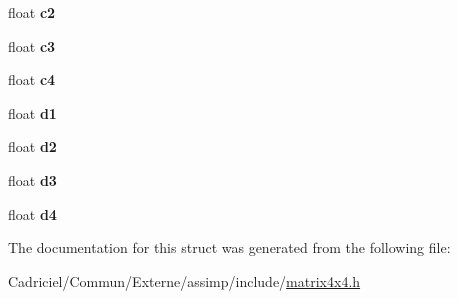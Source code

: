 \begin{DoxyCompactItemize}
\item 
float {\bfseries c2}\hypertarget{structai_matrix4x4_a67425f81054b1097c29b73bf317cfeeb}{}\label{structai_matrix4x4_a67425f81054b1097c29b73bf317cfeeb}

\item 
float {\bfseries c3}\hypertarget{structai_matrix4x4_aec8c5745b90139d472eb4e91f1373c1a}{}\label{structai_matrix4x4_aec8c5745b90139d472eb4e91f1373c1a}

\item 
float {\bfseries c4}\hypertarget{structai_matrix4x4_a7e3288f38a4e00d55c02272e1582e462}{}\label{structai_matrix4x4_a7e3288f38a4e00d55c02272e1582e462}

\item 
float {\bfseries d1}\hypertarget{structai_matrix4x4_a13f3800d9106e3be6d0e60b794c5a5ae}{}\label{structai_matrix4x4_a13f3800d9106e3be6d0e60b794c5a5ae}

\item 
float {\bfseries d2}\hypertarget{structai_matrix4x4_a6f17ca1c7e4b9377d0e332f85aab282b}{}\label{structai_matrix4x4_a6f17ca1c7e4b9377d0e332f85aab282b}

\item 
float {\bfseries d3}\hypertarget{structai_matrix4x4_a8d2910f62b34b1e2ace93b55e4db4b92}{}\label{structai_matrix4x4_a8d2910f62b34b1e2ace93b55e4db4b92}

\item 
float {\bfseries d4}\hypertarget{structai_matrix4x4_ac0a65b51f126f7331b4f7dbbd82f3d63}{}\label{structai_matrix4x4_ac0a65b51f126f7331b4f7dbbd82f3d63}

\end{DoxyCompactItemize}


The documentation for this struct was generated from the following file\+:\begin{DoxyCompactItemize}
\item 
Cadriciel/\+Commun/\+Externe/assimp/include/\hyperlink{matrix4x4_8h}{matrix4x4.\+h}\end{DoxyCompactItemize}

